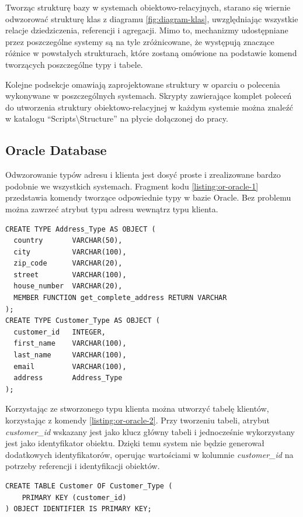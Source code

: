 \documentclass[a4paper,twoside,12pt]{book}
\begin{document}
Tworząc strukturę bazy w systemach obiektowo-relacyjnych, starano się wiernie odwzorować strukturę klas z diagramu \ref{fig:diagram-klas}, uwzględniając wszystkie relacje dziedziczenia, referencji i agregacji. Mimo to, mechanizmy udostępniane przez poszczególne systemy są na tyle zróżnicowane, że występują znaczące różnice w powstałych strukturach, które zostaną omówione na podstawie komend tworzących poszczególne typy i tabele.

Kolejne podsekcje omawiają zaprojektowane struktury w oparciu o polecenia wykonywane w poszczególnych systemach. Skrypty zawierające komplet poleceń do utworzenia struktury obiektowo-relacyjnej w każdym systemie można znaleźć w katalogu ``Scripts\textbackslash Structure'' na płycie dołączonej do pracy.

\subsection{Oracle Database}

Odwzorowanie typów adresu i klienta jest dosyć proste i zrealizowane bardzo podobnie we wszystkich systemach. Fragment kodu \ref{listing:or-oracle-1} przedstawia komendy tworzące odpowiednie typy w bazie Oracle. Bez problemu można zawrzeć atrybut typu adresu wewnątrz typu klienta.

\begin{lstlisting}[style=SQL, caption={Definicja typów adresu i klienta w Oracle.}, label={listing:or-oracle-1}, captionpos=b]
CREATE TYPE Address_Type AS OBJECT (
  country       VARCHAR(50),
  city          VARCHAR(100),
  zip_code      VARCHAR(20),
  street        VARCHAR(100),
  house_number  VARCHAR(20),
  MEMBER FUNCTION get_complete_address RETURN VARCHAR
);
CREATE TYPE Customer_Type AS OBJECT (
  customer_id   INTEGER,
  first_name    VARCHAR(100),
  last_name     VARCHAR(100),
  email         VARCHAR(100),
  address       Address_Type
);
\end{lstlisting}

Korzystając ze stworzonego typu klienta można utworzyć tabelę klientów, korzystając z komendy \ref{listing:or-oracle-2}. Przy tworzeniu tabeli, atrybut \textit{customer\_id} wskazany jest jako klucz główny tabeli i jednocześnie wykorzystany jest jako identyfikator obiektu. Dzięki temu system nie będzie generował dodatkowych identyfikatorów, operując wartościami w kolumnie \textit{customer\_id} na potrzeby referencji i identyfikacji obiektów. 

\begin{lstlisting}[style=SQL, caption={Tworzenie tabeli klientów w Oracle.}, label={listing:or-oracle-2}, captionpos=b]
CREATE TABLE Customer OF Customer_Type (
	PRIMARY KEY (customer_id)
) OBJECT IDENTIFIER IS PRIMARY KEY;
\end{lstlisting}
\end{document}

